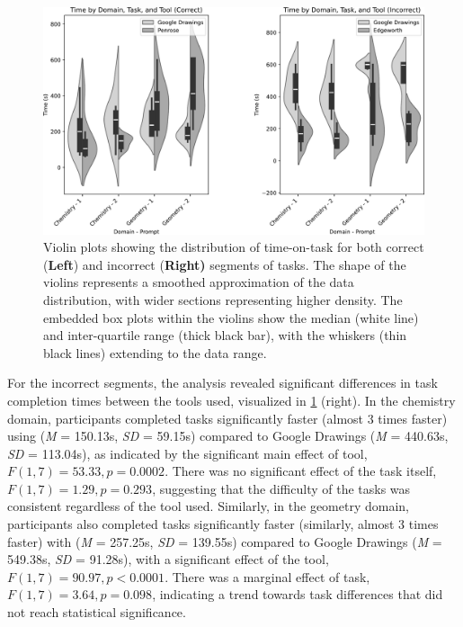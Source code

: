 \begin{figure}[h]
    \centering
    \includegraphics[width=\linewidth]{assets/edgeworth-eval/timing-violin.pdf}
    \caption{Violin plots showing the distribution of time-on-task for both correct (\textbf{Left}) and incorrect (\textbf{Right)} segments of tasks. The shape of the violins represents a smoothed approximation of the data distribution, with wider sections representing higher density. The embedded box plots within the violins show the median (white line) and inter-quartile range (thick black bar), with the whiskers (thin black lines) extending to the data range.}
    \label{fig:timing-violin}
\end{figure}


For the incorrect segments, the analysis revealed significant differences in task completion times between the tools used, visualized in \cref{fig:timing-violin} (right). In the chemistry domain, participants completed tasks significantly faster (almost 3 times faster) using \Edgeworth (\textit{M} = 150.13s, \textit{SD} = 59.15s) compared to Google Drawings (\textit{M} = 440.63s, \textit{SD} = 113.04s), as indicated by the significant main effect of tool, $F(1, 7) = 53.33, p = 0.0002$. There was no significant effect of the task itself, $F(1, 7) = 1.29, p = 0.293$, suggesting that the difficulty of the tasks was consistent regardless of the tool used. Similarly, in the geometry domain, participants also completed tasks significantly faster (similarly, almost 3 times faster) with \Edgeworth (\textit{M} = 257.25s, \textit{SD} = 139.55s) compared to Google Drawings (\textit{M} = 549.38s, \textit{SD} = 91.28s), with a significant effect of the tool, $F(1, 7) = 90.97, p < 0.0001$. There was a marginal effect of task, $F(1, 7) = 3.64, p = 0.098$, indicating a trend towards task differences that did not reach statistical significance. 

